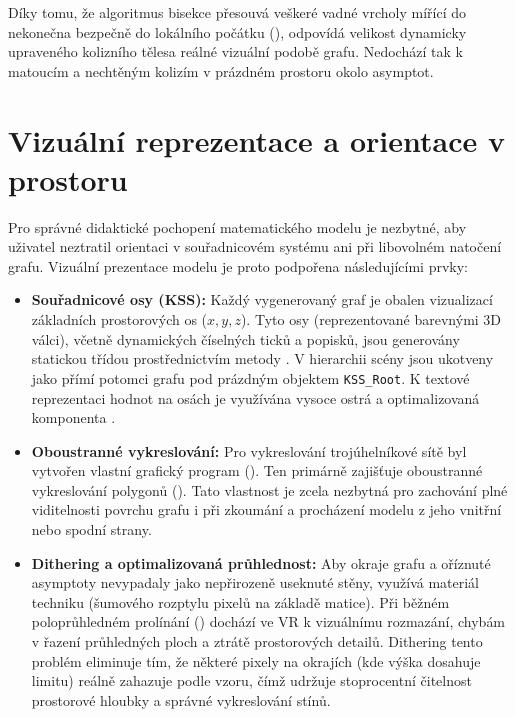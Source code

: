 \documentclass[czech, kiv, sem, he, iso690alph, pdf,viewonly]{fasthesis}
\begin{document}
Díky tomu, že algoritmus bisekce přesouvá veškeré vadné vrcholy mířící do nekonečna bezpečně do lokálního počátku (), 
odpovídá velikost dynamicky upraveného kolizního tělesa  reálné vizuální podobě grafu. Nedochází tak k matoucím a nechtěným kolizím v prázdném prostoru okolo asymptot.


\section{Vizuální reprezentace a orientace v prostoru}
Pro správné didaktické pochopení matematického modelu je nezbytné, aby uživatel neztratil orientaci v souřadnicovém systému ani při libovolném natočení grafu. 
Vizuální prezentace modelu je proto podpořena následujícími prvky:

\begin{itemize}
    \item \textbf{Souřadnicové osy (KSS):} Každý vygenerovaný graf je obalen vizualizací základních prostorových os ($x, y, z$). 
    Tyto osy (reprezentované barevnými 3D válci), včetně dynamických číselných ticků a popisků, jsou generovány statickou třídou  prostřednictvím metody . 
    V hierarchii scény jsou ukotveny jako přímí potomci grafu pod prázdným objektem \texttt{KSS\_Root}. 
    K textové reprezentaci hodnot na osách je využívána vysoce ostrá a optimalizovaná komponenta .
    
    \item \textbf{Oboustranné vykreslování:} Pro vykreslování trojúhelníkové sítě byl vytvořen vlastní grafický program (). 
    Ten primárně zajišťuje oboustranné vykreslování polygonů (). 
    Tato vlastnost je zcela nezbytná pro zachování plné viditelnosti povrchu grafu i při zkoumání a procházení modelu z jeho vnitřní nebo spodní strany.
    
    \item \textbf{Dithering a optimalizovaná průhlednost:} Aby okraje grafu a oříznuté asymptoty nevypadaly jako nepřirozeně useknuté stěny, využívá materiál techniku  
    (šumového rozptylu pixelů na základě matice). Při běžném poloprůhledném prolínání () dochází ve VR k vizuálnímu rozmazání, chybám v řazení průhledných ploch a ztrátě prostorových detailů. 
    Dithering tento problém eliminuje tím, že některé pixely na okrajích (kde výška dosahuje limitu) reálně zahazuje podle vzoru, čímž udržuje stoprocentní čitelnost prostorové hloubky a správné vykreslování stínů.
\end{itemize}
\end{document}
